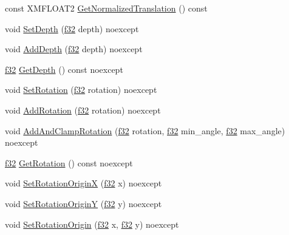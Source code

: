 \begin{DoxyCompactItemize}
\item 
const X\+M\+F\+L\+O\+A\+T2 \hyperlink{structmage_1_1_sprite_transform_a35b4a512d853e08743948f8065d1558f}{Get\+Normalized\+Translation} () const
\item 
void \hyperlink{structmage_1_1_sprite_transform_a1ea0ccde7635fa76483ca4f1a61a6aef}{Set\+Depth} (\hyperlink{namespacemage_a6a44ad388483959dc4dff9f2aef91431}{f32} depth) noexcept
\item 
void \hyperlink{structmage_1_1_sprite_transform_a5ab9a70d616080bf1a10390c11c0c05c}{Add\+Depth} (\hyperlink{namespacemage_a6a44ad388483959dc4dff9f2aef91431}{f32} depth) noexcept
\item 
\hyperlink{namespacemage_a6a44ad388483959dc4dff9f2aef91431}{f32} \hyperlink{structmage_1_1_sprite_transform_aef31bef0a6fe75283b33a059dc3d3ed9}{Get\+Depth} () const noexcept
\item 
void \hyperlink{structmage_1_1_sprite_transform_af56c77372fcaf9fe186433d42b88b6a7}{Set\+Rotation} (\hyperlink{namespacemage_a6a44ad388483959dc4dff9f2aef91431}{f32} rotation) noexcept
\item 
void \hyperlink{structmage_1_1_sprite_transform_abc56f2d334a5adcb9bdd64c5424c1da7}{Add\+Rotation} (\hyperlink{namespacemage_a6a44ad388483959dc4dff9f2aef91431}{f32} rotation) noexcept
\item 
void \hyperlink{structmage_1_1_sprite_transform_a05d54e928fd6ee81d875ad712e7299c9}{Add\+And\+Clamp\+Rotation} (\hyperlink{namespacemage_a6a44ad388483959dc4dff9f2aef91431}{f32} rotation, \hyperlink{namespacemage_a6a44ad388483959dc4dff9f2aef91431}{f32} min\+\_\+angle, \hyperlink{namespacemage_a6a44ad388483959dc4dff9f2aef91431}{f32} max\+\_\+angle) noexcept
\item 
\hyperlink{namespacemage_a6a44ad388483959dc4dff9f2aef91431}{f32} \hyperlink{structmage_1_1_sprite_transform_a56eb8b3e816803f9f4a673fb5c9db05b}{Get\+Rotation} () const noexcept
\item 
void \hyperlink{structmage_1_1_sprite_transform_a06cf658cf8c901324f050255edc82b71}{Set\+Rotation\+OriginX} (\hyperlink{namespacemage_a6a44ad388483959dc4dff9f2aef91431}{f32} x) noexcept
\item 
void \hyperlink{structmage_1_1_sprite_transform_a6c78eca9b59c9dc79e60921efcc11969}{Set\+Rotation\+OriginY} (\hyperlink{namespacemage_a6a44ad388483959dc4dff9f2aef91431}{f32} y) noexcept
\item 
void \hyperlink{structmage_1_1_sprite_transform_a9d8e0de5f06dd40ff3bf4dce0af23453}{Set\+Rotation\+Origin} (\hyperlink{namespacemage_a6a44ad388483959dc4dff9f2aef91431}{f32} x, \hyperlink{namespacemage_a6a44ad388483959dc4dff9f2aef91431}{f32} y) noexcept

\end{DoxyCompactItemize}
